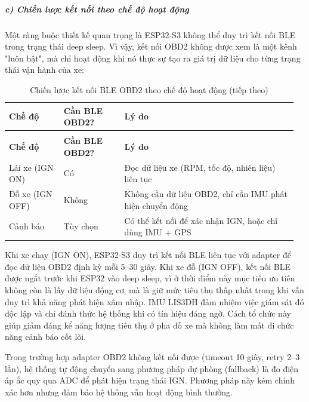 \documentclass[a4paper]{extarticle}
\newcommand{\thesissettableid}[2]{%
  \renewcommand{\thetable}{#1}%
  \renewcommand{\theHtable}{#2}%
}
\begin{document}
\subparagraph{c) Chiến lược kết nối theo chế độ hoạt
động}\label{c-chiux1ebfn-lux1b0ux1ee3c-kux1ebft-nux1ed1i-theo-chux1ebf-ux111ux1ed9-houx1ea1t-ux111ux1ed9ng}

Một ràng buộc thiết kế quan trọng là ESP32-S3 không thể duy trì kết nối
BLE trong trạng thái deep sleep. Vì vậy, kết nối OBD2 không được xem là
một kênh "luôn bật", mà chỉ hoạt động khi nó thực sự tạo ra giá trị dữ liệu
cho từng trạng thái vận hành của xe:


{\thesissettableid{3.6}{tab-ch3-chien-luoc-ket-noi-ble-obd2-theo-che-o-hoat-ong}
\def\LTcaptype{table}
\begin{longtable}{|L{0.182\linewidth}|L{0.203\linewidth}|L{0.580\linewidth}|}
\caption{Chiến lược kết nối BLE OBD2 theo chế độ hoạt động}\label{tab:ch3-chien-luoc-ket-noi-ble-obd2-theo-che-o-hoat-ong}\\
\hline \textbf{Chế độ} & \textbf{Cần BLE OBD2?} & \textbf{Lý do} \\
\hline
\endfirsthead
\caption[]{Chiến lược kết nối BLE OBD2 theo chế độ hoạt động (tiếp theo)}\\
\hline \textbf{Chế độ} & \textbf{Cần BLE OBD2?} & \textbf{Lý do} \\
\hline
\endhead
\hline
\endfoot
\endlastfoot
Lái xe (IGN ON) & Có & Đọc dữ liệu xe (RPM, tốc độ, nhiên liệu) liên
tục \\\hline
Đỗ xe (IGN OFF) & Không & Không cần dữ liệu OBD2, chỉ cần IMU phát hiện
chuyển động \\\hline
Cảnh báo & Tùy chọn & Có thể kết nối để xác nhận IGN, hoặc chỉ dùng IMU
+ GPS \\\hline
\end{longtable}
}


Khi xe chạy (IGN ON), ESP32-S3 duy trì kết nối BLE liên tục với adapter để
đọc dữ liệu OBD2 định kỳ mỗi 5--30 giây. Khi xe đỗ (IGN OFF), kết nối BLE
được ngắt trước khi ESP32 vào deep sleep, vì ở thời điểm này mục tiêu ưu
tiên không còn là lấy dữ liệu động cơ, mà là giữ mức tiêu thụ thấp nhất
trong khi vẫn duy trì khả năng phát hiện xâm nhập. IMU LIS3DH đảm nhiệm
việc giám sát đó độc lập và chỉ đánh thức hệ thống khi có tín hiệu đáng
ngờ. Cách tổ chức này giúp giảm đáng kể năng lượng tiêu thụ ở pha đỗ xe mà
không làm mất đi chức năng cảnh báo cốt lõi.

Trong trường hợp adapter OBD2 không kết nối được (timeout 10 giây, retry
2--3 lần), hệ thống tự động chuyển sang phương pháp dự phòng (fallback)
là đo điện áp ắc quy qua ADC để phát hiện trạng thái IGN. Phương pháp
này kém chính xác hơn nhưng đảm bảo hệ thống vẫn hoạt động bình thường.
\end{document}
